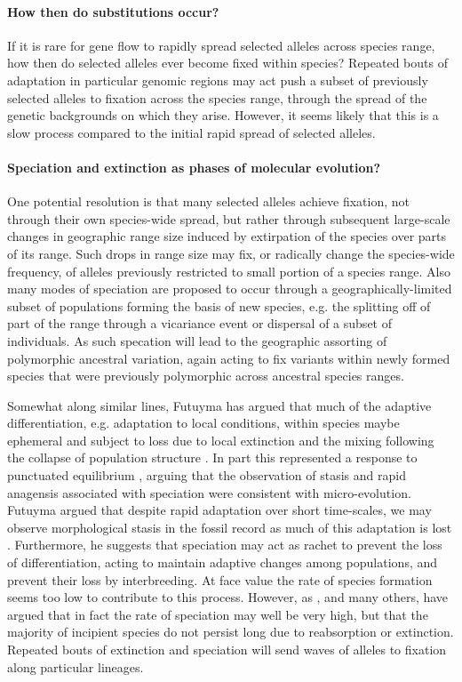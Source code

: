 \documentclass{article}
\begin{document}
\paragraph{How then do substitutions occur?}
If it is rare for gene flow to rapidly spread selected alleles across
species range, how then do selected alleles ever become fixed within
species? Repeated bouts of adaptation in particular genomic regions may act 
push a subset of previously selected alleles to fixation across the
species range, through the spread of the genetic backgrounds on which they arise.  
However, it seems likely that this is a slow process compared to the
initial rapid spread of selected alleles.

\paragraph{Speciation and extinction as phases of molecular evolution?}
One potential resolution is that many selected alleles achieve
fixation, not through their own species-wide spread, but rather
through subsequent large-scale changes in geographic range size
induced by extirpation of the species over parts of its range. Such drops in range size may fix, or radically change the
species-wide frequency, of alleles previously restricted to small portion of a species range. 
Also many modes of speciation are proposed to occur through a
geographically-limited subset of populations forming the basis of new species, e.g. the splitting off
of part of the range through a vicariance event or dispersal of a
subset of individuals. As such specation will lead to the geographic assorting of
polymorphic ancestral variation, again acting to fix variants within
newly formed species that were previously polymorphic across ancestral species ranges. 

Somewhat along similar lines, Futuyma has argued that much of the adaptive differentiation,
e.g. adaptation to local conditions, within species maybe ephemeral and
subject to loss due to local extinction and the mixing following the collapse of population
structure \citep{Futuyma:10,FUTUYMA:87}. In part this represented a
response to punctuated equilibrium \citep{eldredgegould72}, arguing
that the observation of stasis and rapid anagensis associated with
speciation were consistent with micro-evolution. 
Futuyma argued that despite rapid adaptation over short time-scales, we
may observe morphological stasis in the
fossil record as
much of this adaptation is lost \citep[see
also][]{Eldredge:05}. Furthermore, he suggests that speciation
may act as rachet to prevent the loss of differentiation, acting to
maintain adaptive changes among populations, and prevent their loss by
interbreeding. At face value the rate of species formation seems too low to
contribute to this process. However, as \citep{Rosenblum:12}, and many
others, have argued that in fact the rate of speciation may well be very high,
but that the majority of incipient species do not persist long due to
reabsorption or extinction. Repeated bouts of extinction and
speciation will send waves of alleles
to fixation along particular lineages. 
\end{document}

